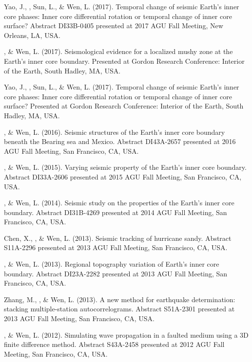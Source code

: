 \begin{etaremune}
    Yao, J., \Tian, Sun, L., \& Wen, L. (2017).
    Temporal change of seismic Earth's inner core phases: Inner core differential rotation or temporal change of inner core surface?
    Abstract DI33B-0405 presented at 2017 AGU Fall Meeting, New Orleans, LA, USA.
\item
    \Tian, \& Wen, L. (2017).
    Seismological evidence for a localized mushy zone at the Earth's inner core boundary.
    Presented at Gordon Research Conference: Interior of the Earth, South Hadley, MA, USA.
\item
    Yao, J., \Tian, Sun, L., \& Wen, L. (2017).
    Temporal change of seismic Earth's inner core phases: Inner core differential rotation or temporal change of inner core surface?
    Presented at Gordon Research Conference: Interior of the Earth, South Hadley, MA, USA.
\item
    \Tian, \& Wen, L. (2016).
    Seismic structures of the Earth's inner core boundary beneath the Bearing sea and Mexico.
    Abstract DI43A-2657 presented at 2016 AGU Fall Meeting, San Francisco, CA, USA.
\item
    \Tian, \& Wen, L. (2015).
    Varying seismic property of the Earth's inner core boundary.
    Abstract DI33A-2606 presented at 2015 AGU Fall Meeting, San Francisco, CA, USA.
\item
    \Tian, \& Wen, L. (2014).
    Seismic study on the properties of the Earth's inner core boundary.
    Abstract DI31B-4269 presented at 2014 AGU Fall Meeting, San Francisco, CA, USA.
\item
    Chen, X., \Tian, \& Wen, L. (2013).
    Seismic tracking of hurricane sandy.
    Abstract S11A-2296 presented at 2013 AGU Fall Meeting, San Francisco, CA, USA.
\item
    \Tian, \& Wen, L. (2013).
    Regional topography variation of Earth's inner core boundary.
    Abstract DI23A-2282 presented at 2013 AGU Fall Meeting, San Francisco, CA, USA.
\item
    Zhang, M., \Tian, \& Wen, L. (2013).
    A new method for earthquake determination: stacking multiple-station autocorrelograms.
    Abstract S51A-2301 presented at 2013 AGU Fall Meeting, San Francisco, CA, USA.
\item
    \Tian, \& Wen, L. (2012).
    Simulating wave propagation in a faulted medium using a 3D finite difference method.
    Abstract S43A-2458 presented at 2012 AGU Fall Meeting, San Francisco, CA, USA.
\end{etaremune}
